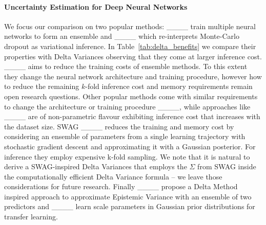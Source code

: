 \paragraph{Uncertainty Estimation for Deep Neural Networks}
We focus our comparison on two popular methods: ____ train multiple neural networks to form an ensemble and ____ which re-interprets Monte-Carlo dropout as variational inference. In Table~\ref{tab:delta_benefits} we compare their properties with Delta Variances observing that they come at larger inference cost.
____ aims to reduce the training costs of ensemble methods. To this extent they change the neural network architecture and training procedure, however how to reduce the remaining $k$-fold inference cost and memory requirements remain open research questions. Other popular methods come with similar requirements to change the architecture or training procedure ____,
while approaches like ____ are of non-parametric flavour exhibiting inference cost that increases with the dataset size. 
%
SWAG ____ reduces the training and memory cost by considering an ensemble of parameters from a single learning trajectory with stochastic gradient descent and approximating it with a Gaussian posterior. For inference they employ expensive k-fold sampling. We note that it is natural to derive a SWAG-inspired Delta Variances that employs the $\Sigma$ from SWAG inside the computationally efficient Delta Variance formula -- we leave those considerations for future research.
%
Finally
____ propose a Delta Method inspired approach to approximate Epistemic Variance with an ensemble of two predictors and ____ learn scale parameters in Gaussian prior distributions for transfer learning.